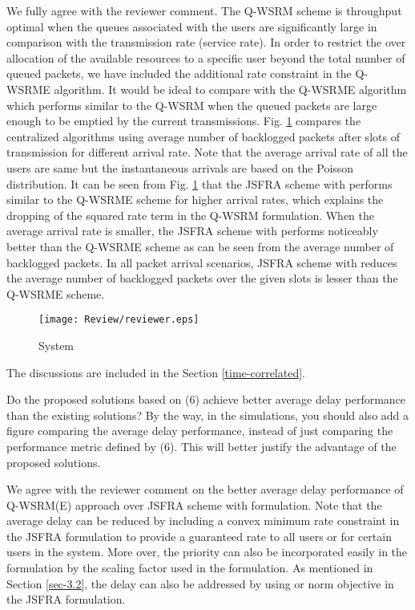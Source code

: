 \resp We fully agree with the reviewer comment. The Q-WSRM scheme is throughput optimal when the queues associated with the users are significantly large in comparison with the transmission rate (service rate). In order to restrict the over allocation of the available resources to a specific user beyond the total number of queued packets, we have included the additional rate constraint in the Q-WSRME algorithm. It would be ideal to compare with the Q-WSRME algorithm which performs similar to the Q-WSRM when the queued packets are large enough to be emptied by the current transmissions. Fig. \ref{fig-review} compares the centralized algorithms using average number of backlogged packets after  slots of transmission for different arrival rate. Note that the average arrival rate of all the users are same but the instantaneous arrivals are based on the Poisson distribution. It can be seen from Fig. \ref{fig-review} that the JSFRA scheme with  performs similar to the Q-WSRME scheme for higher arrival rates, which explains the dropping of the squared rate term in the Q-WSRM formulation. When the average arrival rate is smaller, the JSFRA scheme with  performs noticeably better than the Q-WSRME scheme as can be seen from the average number of backlogged packets. In all packet arrival scenarios, JSFRA scheme with  reduces the average number of backlogged packets over the given slots is lesser than the Q-WSRME scheme.
\begin{figure}
\centering
\texttt{[image: Review/reviewer.eps]}
\label{fig-review}
\caption{System }
\end{figure}
The discussions are included in the Section \ref{time-correlated}.

 Do the proposed solutions based on (6) achieve better average delay performance than the existing solutions? By the way, in the simulations, you should also add a figure comparing the average delay performance, instead of just comparing the performance metric defined by (6). This will better justify the advantage of the proposed solutions.

\resp We agree with the reviewer comment on the better average delay performance of Q-WSRM(E) approach over JSFRA scheme with  formulation. Note that the average delay can be reduced by including a convex minimum rate constraint in the JSFRA formulation to provide a guaranteed rate to all users or for certain users in the system. More over, the priority can also be incorporated easily in the formulation by the scaling factor  used in the formulation. As mentioned in Section \ref{sec-3.2}, the delay can also be addressed by using  or  norm objective in the JSFRA formulation.

